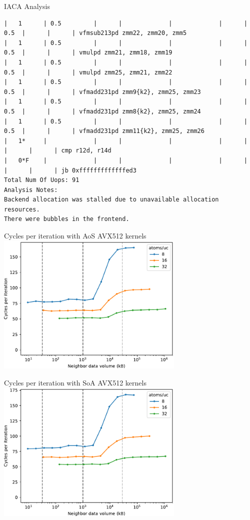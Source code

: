 \documentclass[aspectratio=169,t]{beamer}
\begin{document}
  \begin{frame}[fragile]{IACA Analysis}
    \vspace{-20pt}
    \begin{lstlisting}[basicstyle=\tt\fontsize{4pt}{6pt}\selectfont]
|   1      | 0.5         |      |             |             |      | 0.5  |      |      | vfmsub213pd zmm22, zmm20, zmm5
|   1      | 0.5         |      |             |             |      | 0.5  |      |      | vmulpd zmm21, zmm18, zmm19
|   1      | 0.5         |      |             |             |      | 0.5  |      |      | vmulpd zmm25, zmm21, zmm22
|   1      | 0.5         |      |             |             |      | 0.5  |      |      | vfmadd231pd zmm9{k2}, zmm25, zmm23
|   1      | 0.5         |      |             |             |      | 0.5  |      |      | vfmadd231pd zmm8{k2}, zmm25, zmm24
|   1      | 0.5         |      |             |             |      | 0.5  |      |      | vfmadd231pd zmm11{k2}, zmm25, zmm26
|   1*     |             |      |             |             |      |      |      |      | cmp r12d, r14d
|   0*F    |             |      |             |             |      |      |      |      | jb 0xfffffffffffffed3
Total Num Of Uops: 91
Analysis Notes:
Backend allocation was stalled due to unavailable allocation resources.
There were bubbles in the frontend.
    \end{lstlisting}
  \end{frame}

  \begin{frame}[fragile]{Cycles per iteration with AoS AVX512 kernels}
    \includegraphics[width=9cm]{results_aos_casclakesp2_neighbor_vol.pdf}
  \end{frame}

  \begin{frame}[fragile]{Cycles per iteration with SoA AVX512 kernels}
    \includegraphics[width=9cm]{results_soa_casclakesp2_neighbor_vol.pdf}
  \end{frame}
\end{document}
